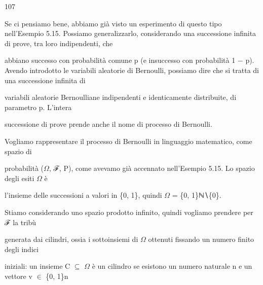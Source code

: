 \documentclass[a4paper,portrait,12pt]{article}
\begin{document}
107





\begin{flushleft}
Se ci pensiamo bene, abbiamo gi\`{a} visto un esperimento di questo tipo nell'Esempio 5.15. Possiamo generalizzarlo, considerando una successione infinita di prove, tra loro indipendenti, che
\end{flushleft}


\begin{flushleft}
abbiano successo con probabilit\`{a} comune p (e insuccesso con probabilit\`{a} 1 $-$ p). Avendo introdotto le variabili aleatorie di Bernoulli, possiamo dire che si tratta di una successione infinita di
\end{flushleft}


\begin{flushleft}
variabili aleatorie Bernoulliane indipendenti e identicamente distribuite, di parametro p. L'intera
\end{flushleft}


\begin{flushleft}
successione di prove prende anche il nome di processo di Bernoulli.
\end{flushleft}


\begin{flushleft}
Vogliamo rappresentare il processo di Bernoulli in linguaggio matematico, come spazio di
\end{flushleft}


\begin{flushleft}
probabilit\`{a} ($\Omega$, ℱ, P), come avevamo gi\`{a} accennato nell'Esempio 5.15. Lo spazio degli esiti $\Omega$ \`{e}
\end{flushleft}


\begin{flushleft}
l'insieme delle successioni a valori in \{0, 1\}, quindi $\Omega$ = \{0, 1\}ℕ∖\{0\}.
\end{flushleft}


\begin{flushleft}
Stiamo considerando uno spazio prodotto infinito, quindi vogliamo prendere per ℱ la tribù
\end{flushleft}


\begin{flushleft}
generata dai cilindri, ossia i sottoinsiemi di $\Omega$ ottenuti fissando un numero finito degli indici
\end{flushleft}


\begin{flushleft}
iniziali: un insieme C $\subseteq$ $\Omega$ \`{e} un cilindro se esistono un numero naturale n e un vettore v $\in$ \{0, 1\}n
\end{flushleft}
\end{document}
